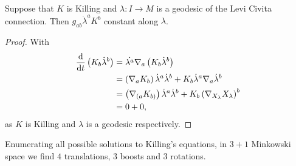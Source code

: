 \begin{lemma}
    Suppose that $K$ is Killing and $\lambda : I \to M$ is a geodesic of the Levi Civita connection. Then $g_{ab} \dot{\lambda}^{a} K^{b}$ constant along $\lambda$.
\end{lemma}

\begin{proof}
    With
    \begin{align}
        \dv{t} \left( K_b \dot{\lambda}^{b} \right) &= \dot{\lambda^{a}} \nabla_a \left( K_b \dot{\lambda}^{b} \right) \\
        &= \left( \nabla_a K_b \right) \dot{\lambda}^{a} \dot{\lambda}^{b} + K_b \dot{\lambda}^{a} \nabla_a \dot{\lambda}^{b} \\
        &= \left( \nabla_{(a} K_{b)} \right) \dot{\lambda}^{a} \dot{\lambda}^{b} + K_b \left( \nabla_{X_\lambda} X_\lambda \right)^{b} \\
        &= 0 + 0
    ,\end{align}
    as $K$ is Killing and $\lambda$ is a geodesic respectively.
\end{proof}

Enumerating all possible solutions to Killing's equations, in $3+1$ Minkowski space we find $4$ translations, $3$ boosts and $3$ rotations.

